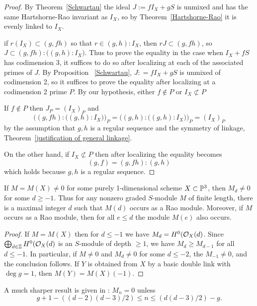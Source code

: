 \begin{proof} By Theorem~\ref{Schwartau} the  ideal $J := fI_X+gS$ is unmixed and has the same Hartshorne-Rao invariant as $I_X$,
so by Theorem~\ref{Hartshorne-Rao} it is evenly linked to $I_X$.

if $r(I_X) \subset (g,fh)$ so that $r\in (g,h):I_X$, then $rJ\subset (g,fh)$, so $J \subset (g,fh):\bigl((g,h):I_X\bigr)$.
Thus to prove the equality in the case when $I_X+fS$ has codimension 3, it suffices to do so after localizing at each of the associated primes of $J$. 
By Proposition ~\ref{Schwartau}, $J: = fI_X+gS$ is unmixed of codimension 2, so it suffices to prove the equality after
localizing at a codimension 2 prime $P$. By our hypothesis, either $f\notin P$ or $I_X\not\subset P$

If $f\notin P$ then $J_P = (I_X)_P$ and 
$$
\biggl((g,fh):\bigl((g,h):I_X\bigr)\biggr)_P = \biggl((g,h):\bigl((g,h):I_X\bigr)\biggr)_P = (I_X)_P
$$
by the assumption that $g,h$ is a regular sequence and the symmetry of linkage, Theorem~\ref{justification of general linkage}.

On the other hand, if $I_X \not\subset P$ then after localizing the equality becomes
$$
(g,f) = (g,fh):(g,h)
$$
which holds because $g,h$ is a regular sequence. 
\end{proof}

\begin{corollary}\label{twist by 1} If $M = M(X) \neq 0$ for some purely 1-dimensional scheme $X\subset \PP^{3}$, then $M_{d} \neq 0$ for some $d\geq -1$. Thus
for any nonzero graded $S$-module $M$ of finite length,
there is a maximal integer $d$ such that $M(d)$ occurs as a Rao module. Moreover, if $M$ occurs as a
Rao module, then for all $e\leq d$ the module
$M(e)$ also occurs.
\end{corollary}

\begin{proof} If $M = M(X)$ then for $d \leq -1$ we have $M_{d} = H^{0}(\sO_{X}(d)$.  Since 
$\bigoplus_{d \in \ZZ}H^{0}(\sO_{X}(d)$ is an $S$-module of depth $\geq 1$, we have
$M_{d}\geq M_{d-1}$ for all $d\leq -1$. In particular, if $M\neq 0$ and $M_{d}\neq 0$ for some
$d\leq -2$, the $M_{-1} \neq 0$, and the conclusion follows.
 If $Y$ is obtained from $X$ by a basic double link with $\deg g = 1$, then $M(Y) = M(X)(-1).$
\end{proof}

A much sharper result is given in \cite{M-D-P}: $M_{n} = 0$ unless 
$$
 g+1-((d-2)(d-3)/2) \leq n \leq (d(d-3)/2)-g.
 $$

